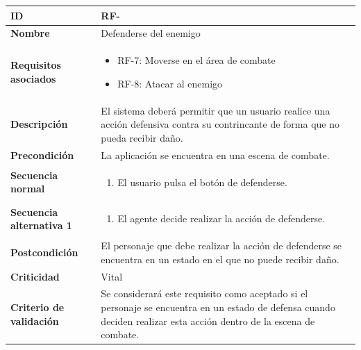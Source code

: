 \begin{center}
	\begin{tabular}{ | p{4.7cm} | p{10cm} | } 
		\hline
		
		\textbf{ID} & RF-\arabic{contador_requisitos_funcionales}
		{contador_requisitos_funcionales} \\
		
		\hline 
		\textbf{Nombre} &
		Defenderse del enemigo\\ 
		
		\hline
		\textbf{Requisitos asociados} & 
		\begin{itemize}
			\item RF-7: Moverse en el área de combate
			\item RF-8: Atacar al enemigo
		\end{itemize}\\
		
		\hline
		\textbf{Descripción} & 
		El sistema deberá permitir que un usuario realice una acción defensiva contra su contrincante de forma que no pueda recibir daño.\\
		
		\hline
		\textbf{Precondición} & 
		La aplicación se encuentra en una escena de combate.\\
		
		\hline
		\textbf{Secuencia normal} &
		\begin{enumerate}
			\item El usuario pulsa el botón de defenderse.
		\end{enumerate}
		\\
		
		\hline
		\textbf{Secuencia alternativa 1} &
		\begin{enumerate}
			\item El agente decide realizar la acción de defenderse.
		\end{enumerate}
		\\
		
		\hline
		\textbf{Postcondición} & 
		El personaje que debe realizar la acción de defenderse se encuentra en un estado en el que no puede recibir daño.\\
		
		\hline 
		\textbf{Criticidad} &
		Vital\\
		
		\hline 
		\textbf{Criterio de validación} & 
		Se considerará este requisito como aceptado si el personaje se encuentra en un estado de defensa cuando deciden realizar esta acción dentro de la escena de combate.\\
		
		\hline
	\end{tabular}
\end{center}

